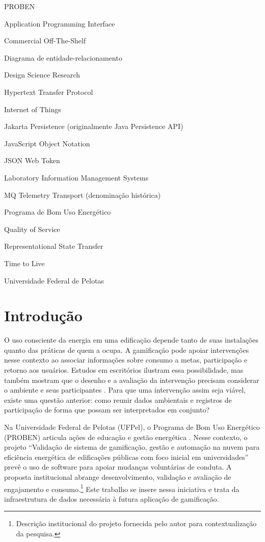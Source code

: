 \documentclass[tcc,capa]{texufpel}
\newif\ifemrevisao
\newcommand{\tintarevisao}{\ifemrevisao\color{correvisao}\fi}
\DeclareRobustCommand{\rev}[1]{{\tintarevisao #1}}
\begin{document}
\listoffigures
\listoftables
\begin{listofabbrv}{PROBEN}
\item[\textbf{API}] Application Programming Interface
\item[\textbf{COTS}] Commercial Off-The-Shelf
\item[\textbf{DER}] Diagrama de entidade-relacionamento
\item[\textbf{DSR}] Design Science Research
\item[\textbf{HTTP}] Hypertext Transfer Protocol
\item[\textbf{IoT}] Internet of Things
\item[\textbf{JPA}] \rev{Jakarta Persistence (originalmente Java Persistence API)}
\item[\textbf{JSON}] JavaScript Object Notation
\item[\textbf{JWT}] JSON Web Token
\item[\textbf{LIMS}] Laboratory Information Management Systems
\item[\textbf{MQTT}] \rev{MQ Telemetry Transport (denominação histórica)}
\item[\textbf{PROBEN}] Programa de Bom Uso Energético
\item[\textbf{QoS}] Quality of Service
\item[\textbf{REST}] Representational State Transfer
\item[\textbf{TTL}] Time to Live
\item[\textbf{UFPel}] Universidade Federal de Pelotas
\end{listofabbrv}
\tableofcontents

\chapter{Introdução}\label{cap:introducao}
O uso consciente da energia em uma edificação depende tanto de suas instalações quanto das práticas de quem a ocupa. A gamificação pode apoiar intervenções nesse contexto ao associar informações sobre consumo a metas, participação e retorno aos usuários. Estudos em escritórios ilustram essa possibilidade, mas também mostram que o desenho e a avaliação da intervenção precisam considerar o ambiente e seus participantes \cite{oppong2020,iria2020}. Para que uma intervenção assim seja viável, existe uma questão anterior: como reunir dados ambientais e registros de participação de forma que possam ser interpretados em conjunto?

Na Universidade Federal de Pelotas (UFPel), o Programa de Bom Uso Energético (PROBEN) articula ações de educação e gestão energética \cite{probenUfpel2026}. Nesse contexto, o projeto ``Validação de sistema de gamificação, gestão e automação na nuvem para eficiência energética de edificações públicas com foco inicial em universidades'' prevê o uso de software para apoiar mudanças voluntárias de conduta. A proposta institucional abrange desenvolvimento, validação e avaliação de engajamento e consumo.\footnote{Descrição institucional do projeto fornecida pelo autor para contextualização da pesquisa.} Este trabalho se insere nessa iniciativa e trata da infraestrutura de dados necessária à futura aplicação de gamificação.
\end{document}
